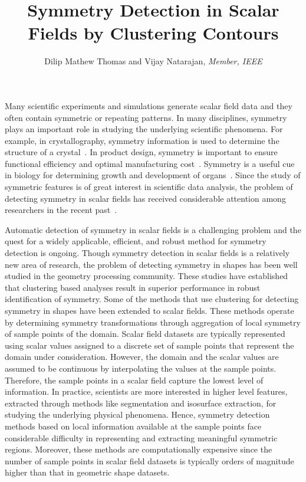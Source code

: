 \documentclass[review,journal]{vgtc}         %
\title{Symmetry Detection in Scalar Fields by Clustering Contours}
\author{Dilip Mathew Thomas and Vijay Natarajan, \textit{Member, IEEE}}
\begin{document}

\maketitle
Many scientific experiments and simulations generate scalar field data and 
they often contain symmetric or repeating patterns. In many disciplines, 
symmetry plays an important role in studying the underlying scientific phenomena. 
For example, in crystallography, symmetry information is used to determine 
the structure of a crystal~\cite{som07}. In product design, symmetry is important 
to ensure functional efficiency and optimal manufacturing cost~\cite{booth02}. Symmetry is a 
useful cue in biology for determining growth and development of organs~\cite{stev06}. Since 
the study of symmetric features is of great interest in scientific data 
analysis, the problem of detecting symmetry in scalar fields has received 
considerable attention among researchers in the recent past~\cite{ThomN11,HongS08,kerbWKS11,ThomN13,MasoodTN13}.

Automatic detection of symmetry in scalar fields is a challenging problem and 
the quest for a widely applicable, efficient, and robust method for symmetry 
detection is ongoing. Though symmetry detection in scalar
fields is a relatively new area of research, the problem of detecting symmetry
in shapes has been well studied in the geometry processing community.
These studies have established that clustering based analyses result in superior
performance in robust identification of symmetry. Some of the methods
that use clustering for detecting symmetry in shapes have been extended to
scalar fields. These methods operate by determining symmetry
transformations through aggregation of local symmetry of sample points of the
domain. Scalar field datasets are typically represented using scalar values 
assigned to a discrete set of sample points that represent the domain under 
consideration. However, the domain and the scalar values are assumed to be continuous by
interpolating the values at the sample points. Therefore, the sample points in a scalar 
field capture the lowest level of information. In practice, scientists are more interested
in higher level features, extracted through methods like segmentation and isosurface extraction,
for studying the underlying physical phenomena. Hence, symmetry detection methods based on 
local information available at the sample points face considerable difficulty in representing 
and extracting meaningful symmetric regions. Moreover, these methods are computationally 
expensive since the number of sample points in scalar field datasets is typically orders of magnitude
higher than that in geometric shape datasets.
\end{document}
